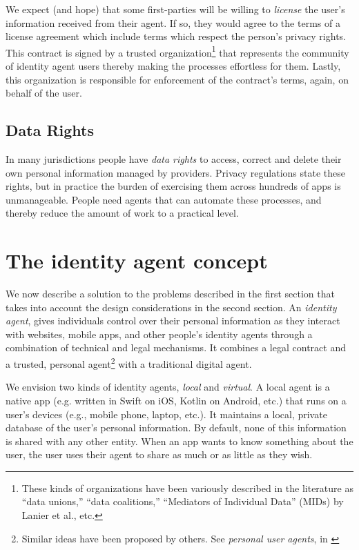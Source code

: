 \documentclass[11pt, oneside]{article}   	%
\begin{document}
We expect (and hope) that some first-parties will be willing to \emph{license} the user's information received from their agent. If so, they would agree to the terms of a license agreement which include terms which respect the person's privacy rights. This contract is signed by a trusted organization\footnote{These kinds of organizations have been variously described in the literature as ``data unions,'' ``data coalitions,'' ``Mediators of Individual Data'' (MIDs) by Lanier et al.\cite{Lanier2018}, etc.} that represents the community of identity agent users thereby making the processes effortless for them. Lastly, this organization is responsible for enforcement of the contract's terms, again, on behalf of the user.

\subsection{Data Rights}

In many jurisdictions people have \emph{data rights} to access, correct and delete their own personal information managed by providers. Privacy regulations state these rights, but in practice the burden of exercising them across hundreds of apps is unmanageable. People need agents that can automate these processes, and thereby reduce the amount of work to a practical level. 

\section{The identity agent concept} %

 We now describe a solution to the problems described in the first section that takes into account the design considerations in the second section. An \emph{identity agent}, gives individuals control over their personal information as they interact with websites, mobile apps, and other people's identity agents through a combination of technical and legal mechanisms. It combines a legal contract and a trusted, personal agent\footnote{Similar ideas have been proposed by others. See \emph{personal user agents}, in \cite[p24]{Flanagan2020}} with a traditional digital agent\cite{Graham2023}. 

We envision two kinds of identity agents, \emph{local} and \emph{virtual}. A local agent is a native app (e.g. written in Swift on iOS, Kotlin on Android, etc.) that runs on a user's devices (e.g., mobile phone, laptop, etc.). It maintains a local, private database of the user's personal information. By default, none of this information is shared with any other entity. When an app wants to know something about the user, the user uses their agent to share as much or as little as they wish. 
\end{document}
